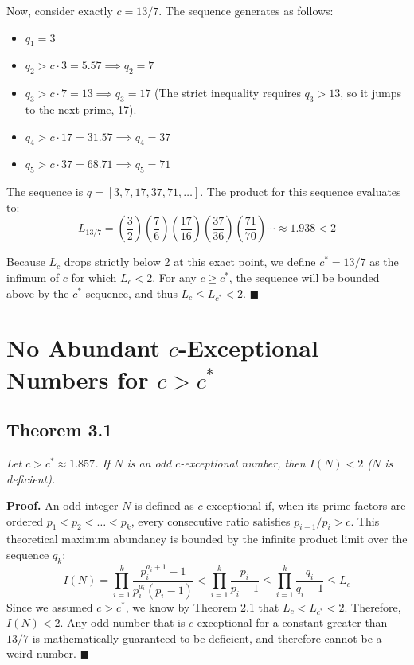 \documentclass{erdos_paper}
\begin{document}
Now, consider exactly $c = 13/7$.
The sequence generates as follows:
\begin{itemize}
    \item $q_1 = 3$
    \item $q_2 > c \cdot 3 = 5.57 \implies q_2 = 7$
    \item $q_3 > c \cdot 7 = 13 \implies q_3 = 17$ (The strict inequality requires $q_3 > 13$, so it jumps to the next prime, 17).
    \item $q_4 > c \cdot 17 = 31.57 \implies q_4 = 37$
    \item $q_5 > c \cdot 37 = 68.71 \implies q_5 = 71$
\end{itemize}
The sequence is $q = [3, 7, 17, 37, 71, \dots]$.
The product for this sequence evaluates to:
$$ L_{13/7} = \left(\frac{3}{2}\right) \left(\frac{7}{6}\right) \left(\frac{17}{16}\right) \left(\frac{37}{36}\right) \left(\frac{71}{70}\right) \cdots \approx 1.938 < 2 $$

Because $L_c$ drops strictly below 2 at this exact point, we define $c^{\ast} = 13/7$ as the infimum of $c$ for which $L_c < 2$. For any $c \ge c^{\ast}$, the sequence will be bounded above by the $c^{\ast}$ sequence, and thus $L_c \le L_{c^{\ast}} < 2$. $\blacksquare$

\section{No Abundant $c$-Exceptional Numbers for $c > c^{\ast}$}

\subsection{Theorem 3.1}

\textit{Let $c > c^{\ast} \approx 1.857$. If $N$ is an odd $c$-exceptional number, then $I(N) < 2$ ($N$ is deficient).}

\textbf{Proof.} An odd integer $N$ is defined as $c$-exceptional if, when its prime factors are ordered $p_1 < p_2 < \dots < p_k$, every consecutive ratio satisfies $p_{i+1}/p_i > c$. 
This theoretical maximum abundancy is bounded by the infinite product limit over the sequence $q_k$:
$$ I(N) = \prod_{i=1}^k \frac{p_i^{a_i+1}-1}{p_i^{a_i}(p_i-1)} < \prod_{i=1}^k \frac{p_i}{p_i-1} \le \prod_{i=1}^k \frac{q_i}{q_i-1} \le L_c $$
Since we assumed $c > c^{\ast}$, we know by Theorem 2.1 that $L_c < L_{c^{\ast}} < 2$.
Therefore, $I(N) < 2$. Any odd number that is $c$-exceptional for a constant greater than $13/7$ is mathematically guaranteed to be deficient, and therefore cannot be a weird number. $\blacksquare$
\end{document}
